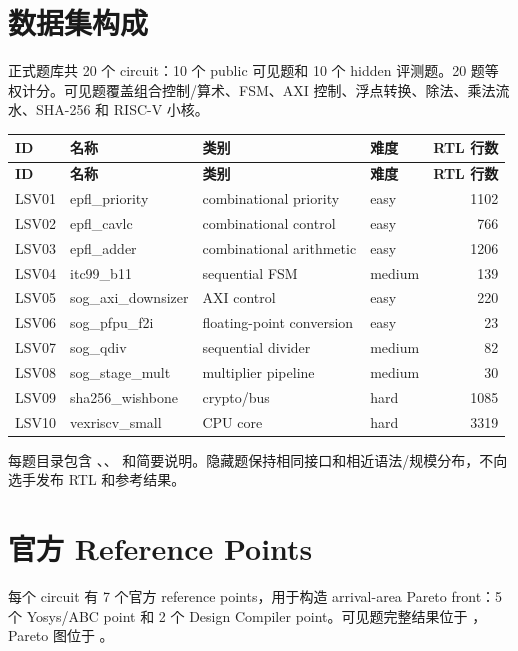 \documentclass[UTF8,a4paper,11pt,fontset=fandol]{ctexart}
\begin{document}
\section{数据集构成}

正式题库共 20 个 circuit：10 个 public 可见题和 10 个 hidden 评测题。20 题等权计分。可见题覆盖组合控制/算术、FSM、AXI 控制、浮点转换、除法、乘法流水、SHA-256 和 RISC-V 小核。

\begin{longtable}{p{}p{}p{}p{}r}
\rowcolor{TableHead}\bfseries ID & \bfseries 名称 & \bfseries 类别 & \bfseries 难度 & \bfseries RTL 行数 \\
\endfirsthead
\rowcolor{TableHead}\bfseries ID & \bfseries 名称 & \bfseries 类别 & \bfseries 难度 & \bfseries RTL 行数 \\
\endhead
LSV01 & epfl\_priority & combinational priority & easy & 1102 \\
LSV02 & epfl\_cavlc & combinational control & easy & 766 \\
LSV03 & epfl\_adder & combinational arithmetic & easy & 1206 \\
LSV04 & itc99\_b11 & sequential FSM & medium & 139 \\
LSV05 & sog\_axi\_downsizer & AXI control & easy & 220 \\
LSV06 & sog\_pfpu\_f2i & floating-point conversion & easy & 23 \\
LSV07 & sog\_qdiv & sequential divider & medium & 82 \\
LSV08 & sog\_stage\_mult & multiplier pipeline & medium & 30 \\
LSV09 & sha256\_wishbone & crypto/bus & hard & 1085 \\
LSV10 & vexriscv\_small & CPU core & hard & 3319 \\
\end{longtable}

每题目录包含 、、 和简要说明。隐藏题保持相同接口和相近语法/规模分布，不向选手发布 RTL 和参考结果。

\section{官方 Reference Points}

每个 circuit 有 7 个官方 reference points，用于构造 arrival-area Pareto front：5 个 Yosys/ABC point 和 2 个 Design Compiler point。可见题完整结果位于 ，Pareto 图位于 。
\end{document}
